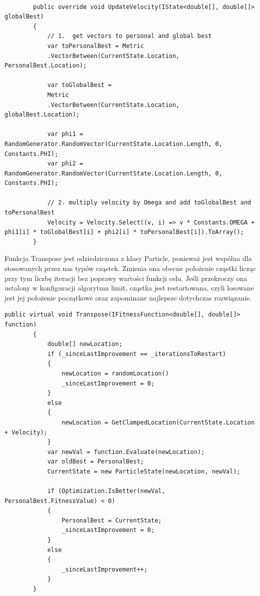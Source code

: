 \documentclass[12pt, twoside, openany, abstract=on]{report}
\theoremstyle{definition}
\begin{document}
\lstset{style=sharpc}
\begin{lstlisting}[frame=single]

        public override void UpdateVelocity(IState<double[], double[]> globalBest)
        {
            // 1.  get vectors to personal and global best
            var toPersonalBest = Metric
            .VectorBetween(CurrentState.Location, PersonalBest.Location);
            
            var toGlobalBest = 
            Metric
            .VectorBetween(CurrentState.Location, globalBest.Location);

            var phi1 = RandomGenerator.RandomVector(CurrentState.Location.Length, 0, Constants.PHI);
            var phi2 = RandomGenerator.RandomVector(CurrentState.Location.Length, 0, Constants.PHI);

            // 2. multiply velocity by Omega and add toGlobalBest and toPersonalBest
            Velocity = Velocity.Select((v, i) => v * Constants.OMEGA + phi1[i] * toGlobalBest[i] + phi2[i] * toPersonalBest[i]).ToArray();
        }

\end{lstlisting}

Funkcja Transpose jest odziedziczona z klasy Particle, ponieważ jest wspólna dla stosowanych przez nas typów cząstek. Zmienia ona obecne położenie cząstki licząc przy tym liczbę iteracji bez poprawy wartości funkcji celu. Jeśli przekroczy ona ustalony w konfiguracji algorytmu limit, cząstka jest restartowana, czyli losowane jest jej położenie początkowe oraz zapominane najlepsze dotychczas rozwiązanie.

\lstset{style=sharpc}
\begin{lstlisting}[frame=single]
public virtual void Transpose(IFitnessFunction<double[], double[]> function)
        {
            double[] newLocation;
            if (_sinceLastImprovement == _iterationsToRestart)
            {
                newLocation = randomLocation()
                _sinceLastImprovement = 0;
            }
            else
            {
                newLocation = GetClampedLocation(CurrentState.Location + Velocity);
            }
            var newVal = function.Evaluate(newLocation);
            var oldBest = PersonalBest;
            CurrentState = new ParticleState(newLocation, newVal);

            if (Optimization.IsBetter(newVal, PersonalBest.FitnessValue) < 0)
            {
                PersonalBest = CurrentState;
                _sinceLastImprovement = 0;
            }
            else
            {
                _sinceLastImprovement++;
            }
        }
\end{lstlisting}
\end{document}
